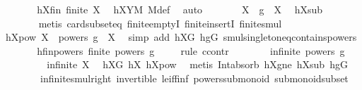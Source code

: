 \begin{isabellebody}
\ \ \ \ \isamarkupfalse%
\ \isamarkupfalse%
\ hXfin{\isacharcolon}{\kern0pt}\ {\isachardoublequoteopen}finite\ X{\isachardoublequoteclose}\ \isamarkupfalse%
\ hXYM\ M{\isacharunderscore}{\kern0pt}def\ \isamarkupfalse%
\ auto\isanewline
\ \ \ \ \isamarkupfalse%
\ \isamarkupfalse%
\ {\isachardoublequoteopen}X\ {\isasymcdots}\ {\isacharbraceleft}{\kern0pt}g{\isacharbraceright}{\kern0pt}\ {\isacharequal}{\kern0pt}\ X{\isachardoublequoteclose}\ \isamarkupfalse%
\ hXsub\ \isanewline
\ \ \ \ \ \ \isamarkupfalse%
\ {\isacharparenleft}{\kern0pt}metis\ card{\isacharunderscore}{\kern0pt}subset{\isacharunderscore}{\kern0pt}eq\ finite{\isachardot}{\kern0pt}emptyI\ finite{\isachardot}{\kern0pt}insertI\ finite{\isacharunderscore}{\kern0pt}smul{\isacharparenright}{\kern0pt}\isanewline
\ \ \ \ \isamarkupfalse%
\ \isamarkupfalse%
\ hXpow{\isacharcolon}{\kern0pt}\ {\isachardoublequoteopen}X\ {\isasymcdots}\ {\isacharparenleft}{\kern0pt}powers\ g{\isacharparenright}{\kern0pt}\ {\isacharequal}{\kern0pt}\ X{\isachardoublequoteclose}\ \isamarkupfalse%
\ {\isacharparenleft}{\kern0pt}simp\ add{\isacharcolon}{\kern0pt}\ hXG\ hgG\ smul{\isacharunderscore}{\kern0pt}singleton{\isacharunderscore}{\kern0pt}eq{\isacharunderscore}{\kern0pt}contains{\isacharunderscore}{\kern0pt}powers{\isacharparenright}{\kern0pt}\isanewline
\ \ \ \ \isamarkupfalse%
\ \isamarkupfalse%
\ hfinpowers{\isacharcolon}{\kern0pt}\ {\isachardoublequoteopen}finite\ {\isacharparenleft}{\kern0pt}powers\ g{\isacharparenright}{\kern0pt}{\isachardoublequoteclose}\isanewline
\ \ \ \ \isamarkupfalse%
{\isacharparenleft}{\kern0pt}rule\ ccontr{\isacharparenright}{\kern0pt}\isanewline
\ \ \ \ \ \ \isamarkupfalse%
\ {\isachardoublequoteopen}infinite\ {\isacharparenleft}{\kern0pt}powers\ g{\isacharparenright}{\kern0pt}{\isachardoublequoteclose}\isanewline
\ \ \ \ \ \ \isamarkupfalse%
\ \isamarkupfalse%
\ {\isachardoublequoteopen}infinite\ X{\isachardoublequoteclose}\ \isamarkupfalse%
\ hXG\ hX{}\ hXpow\ \isamarkupfalse%
\ {\isacharparenleft}{\kern0pt}metis\ Int{\isacharunderscore}{\kern0pt}absorb{}\ hXgne\ hXsub\ hgG\ \isanewline
\ \ \ \ \ \ \ \ infinite{\isacharunderscore}{\kern0pt}smul{\isacharunderscore}{\kern0pt}right\ invertible\ le{\isacharunderscore}{\kern0pt}iff{\isacharunderscore}{\kern0pt}inf\ powers{\isacharunderscore}{\kern0pt}submonoid\ submonoid{\isachardot}{\kern0pt}subset{\isacharparenright}{\kern0pt}\isanewline

\end{isabellebody}

